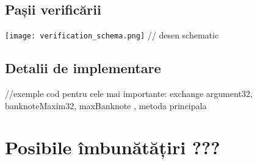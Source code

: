     \subsection{Pașii verificării}
    \vspace{1cm}
        \texttt{[image: verification\_schema.png]}
    // desen schematic
    
    \subsection{Detalii de implementare}
    //exemple cod pentru cele mai importante: exchange argument32, banknoteMaxim32, maxBanknote , metoda principala

\section{Posibile îmbunătățiri ???}


